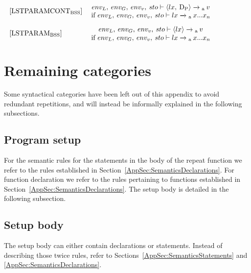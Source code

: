 \begin{equation}
\begin{minipage}{.2\linewidth}
$[\text{LSTPARAMCONT}_\text{BSS}]$
\end{minipage}
\\
\begin{minipage}{.8\linewidth}
\centering
$env_L, \: env_G, \: env_v, \: sto \vdash \langle lx, \: \text{D\textsubscript{P}} \rangle \xrightarrow{}\textsubscript{a} \: v $
\\
if $env_L, \: env_G, \: env_v, \: sto \vdash lx \xrightarrow{} \textsubscript{a} \: x...x_n$
\end{minipage}
\end{equation}


\begin{equation}
\begin{minipage}{.2\linewidth}
$[\text{LSTPARAM}_\text{BSS}]$
\end{minipage}
\\
\begin{minipage}{.8\linewidth}
\centering
$env_L, \: env_G, \: env_v, \: sto \vdash \langle lx \rangle \xrightarrow{}\textsubscript{a} \: v $
\\
if $env_L, \: env_G, \: env_v, \: sto \vdash lx \xrightarrow{} \textsubscript{a} \: x...x_n$
\end{minipage}
\end{equation}

\section{Remaining categories}
Some syntactical categories have been left out of this appendix to avoid redundant repetitions, and will instead be informally explained in the following subsections.\\
\subsection*{Program setup}
For the semantic rules for the statements in the body of the repeat function we refer to the rules established in Section~\ref{AppSec:SemanticsDeclarations}. For function declaration we refer to the rules pertaining to functions established in Section~\ref{AppSec:SemanticsDeclarations}. The setup body is detailed in the following subsection.
\subsection*{Setup body}
The setup body can either contain declarations or statements. Instead of describing those twice rules, refer to Sections~\ref{AppSec:SemanticsStatements} and \ref{AppSec:SemanticsDeclarations}.
